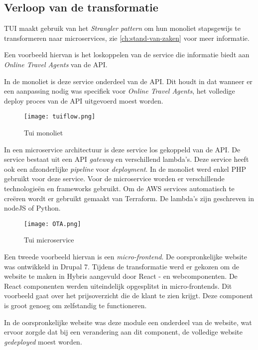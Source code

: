 \subsection{Verloop van de transformatie}

TUI maakt gebruik van het \emph{Strangler pattern} om hun monoliet stapsgewijs te transformeren naar microservices, zie \ref{ch:stand-van-zaken} voor meer informatie.

Een voorbeeld hiervan is het loskoppelen van de service die informatie biedt aan \emph{Online Travel Agents} van de API.

In de monoliet is deze service onderdeel van de API. Dit houdt in dat wanneer er een aanpassing nodig was specifiek voor \emph{Online Travel Agents}, het volledige deploy proces van de API uitgevoerd moest worden.

\begin{figure}[!htb]
    \centering
    \texttt{[image: tuiflow.png]}
    \caption{Tui monoliet \label{tuiflow}}
\end{figure}

In een microservice architectuur is deze service los gekoppeld van de API. De service bestaat uit een API \emph{gateway} en verschillend lambda's. Deze service heeft ook een afzonderlijke \emph{pipeline} voor \emph{deployment}. In de monoliet werd enkel PHP gebruikt voor deze service. Voor de microservice worden er verschillende technologieën en frameworks gebruikt. Om de AWS services automatisch te creëren wordt er gebruikt gemaakt van Terraform. De lambda's zijn geschreven in nodeJS of Python. 

\begin{figure}[!htb]
    \centering
    \texttt{[image: OTA.png]}
    \caption{Tui microservice \label{tuimicro}}
\end{figure}

Een tweede voorbeeld hiervan is een \emph{micro-frontend}. De oorspronkelijke website was ontwikkeld in Drupal 7. Tijdens de transformatie werd er gekozen om de website te maken in Hybris aangevuld door React - en webcomponenten. De React componenten werden uiteindelijk opgesplitst in micro-frontends. Dit voorbeeld gaat over het prijsoverzicht die de klant te zien krijgt. Deze component is groot genoeg om zelfstandig te functioneren. 

In de oorspronkelijke website was deze module een onderdeel van de website, wat ervoor zorgde dat bij een verandering aan dit component, de volledige website \emph{gedeployed} moest worden.

